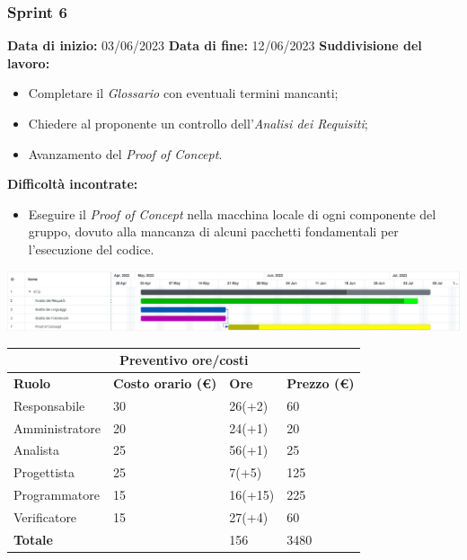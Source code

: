 \documentclass[a4paper, 12pt]{article}
\begin{document}
\subsubsection{Sprint 6}
\textbf{Data di inizio:} 03/06/2023\newline
\textbf{Data di fine:} 12/06/2023\newline
\newline
\textbf{Suddivisione del lavoro:}
\begin{itemize}
	\item Completare il \textit{Glossario} con eventuali termini mancanti;
	\item Chiedere al proponente un controllo dell'\textit{Analisi dei Requisiti};
	\item Avanzamento del \textit{Proof of Concept}.
\end{itemize}
\textbf{Difficoltà incontrate:}
\begin{itemize}
	\item Eseguire il \textit{Proof of Concept} nella macchina locale di ogni componente del gruppo, dovuto alla mancanza di alcuni pacchetti fondamentali per l'esecuzione del codice.
\end{itemize}
\includegraphics[scale=0.24]{RTB_5.png}\newline
\newline

\begin{center}
	\begin{tabularx}{\textwidth}{|X|X|X|X|}
		\hline
		\multicolumn{4}{|c|}{\textbf{Preventivo ore/costi}}                                      \\
		\hline
		\hline
		\textbf{Ruolo}  & \textbf{Costo orario (\euro)} & \textbf{Ore} & \textbf{Prezzo (\euro)} \\
		\hline
		Responsabile    & 30                            & 26(+2)       & 60                      \\
		\hline
		Amministratore  & 20                            & 24(+1)       & 20                      \\
		\hline
		Analista        & 25                            & 56(+1)       & 25                      \\
		\hline
		Progettista     & 25                            & 7(+5)        & 125                     \\
		\hline
		Programmatore   & 15                            & 16(+15)      & 225                     \\
		\hline
		Verificatore    & 15                            & 27(+4)       & 60                      \\
		\hline
		\hline
		\textbf{Totale} &                               & 156          & 3480                    \\
		\hline
	\end{tabularx}\\[8pt]
	\mbox{}\\
\end{center}
\end{document}
